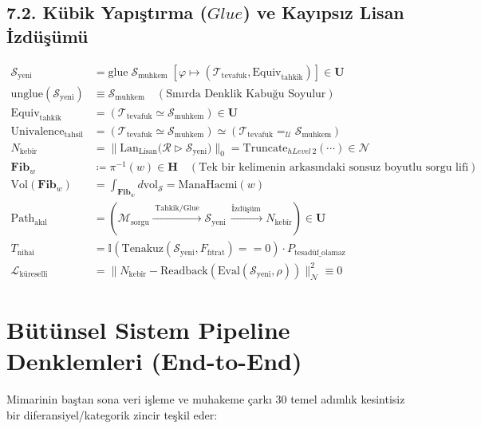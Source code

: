\documentclass[11pt, a4paper]{article}
\begin{document}
\subsection{7.2. Kübik Yapıştırma ($Glue$) ve Kayıpsız Lisan İzdüşümü}
\begin{align}
\mathcal{S}_{\text{yeni}} &= \text{glue} \; \mathcal{S}_{\text{muhkem}} \; \left[ \varphi \mapsto (\mathcal{T}_{\text{tevafuk}}, \text{Equiv}_{\text{tahkik}}) \right] \in \mathbf{U} \\
\text{unglue}(\mathcal{S}_{\text{yeni}}) &\equiv \mathcal{S}_{\text{muhkem}} \quad (\text{Sınırda Denklik Kabuğu Soyulur}) \\
\text{Equiv}_{\text{tahkik}} &= (\mathcal{T}_{\text{tevafuk}} \simeq \mathcal{S}_{\text{muhkem}}) \in \mathbf{U} \\
\text{Univalence}_{\text{tahsil}} &= (\mathcal{T}_{\text{tevafuk}} \simeq \mathcal{S}_{\text{muhkem}}) \simeq (\mathcal{T}_{\text{tevafuk}} =_{\mathcal{U}} \mathcal{S}_{\text{muhkem}}) \\
N_{\text{kebîr}} &= \big\| \text{Lan}_{\text{Lisan}} \big( \mathcal{R} \triangleright \mathcal{S}_{\text{yeni}} \big) \big\|_0 = \text{Truncate}_{hLevel\,2}(\cdots) \in \mathcal{N} \\
\mathbf{Fib}_w &\coloneqq \pi^{-1}(w) \in \mathbf{H} \quad (\text{Tek bir kelimenin arkasındaki sonsuz boyutlu sorgu lifi}) \\
\text{Vol}(\mathbf{Fib}_w) &= \int_{\mathbf{Fib}_w} d\text{vol}_{\mathcal{S}} = \text{ManaHacmi}(w) \\
\text{Path}_{\text{akıl}} &= \left( \mathcal{M}_{\text{sorgu}} \xrightarrow{\;\text{Tahkik/Glue}\;} \mathcal{S}_{\text{yeni}} \xrightarrow{\;\text{İzdüşüm}\;} N_{\text{kebîr}} \right) \in \mathbf{U} \\
T_{\text{nihai}} &= \mathbb{I}\left( \text{Tenakuz}(\mathcal{S}_{\text{yeni}}, F_{\text{fıtrat}}) == 0 \right) \cdot P_{\text{tesadüf\_olamaz}} \\
\mathcal{L}_{\text{küreselli}} &= \| N_{\text{kebîr}} - \text{Readback}(\text{Eval}(\mathcal{S}_{\text{yeni}}, \rho)) \|_{\mathcal{N}}^2 \equiv 0
\end{align}

\section{Bütünsel Sistem Pipeline Denklemleri (End-to-End)}

Mimarinin baştan sona veri işleme ve muhakeme çarkı 30 temel adımlık kesintisiz bir diferansiyel/kategorik zincir teşkil eder:
\end{document}
